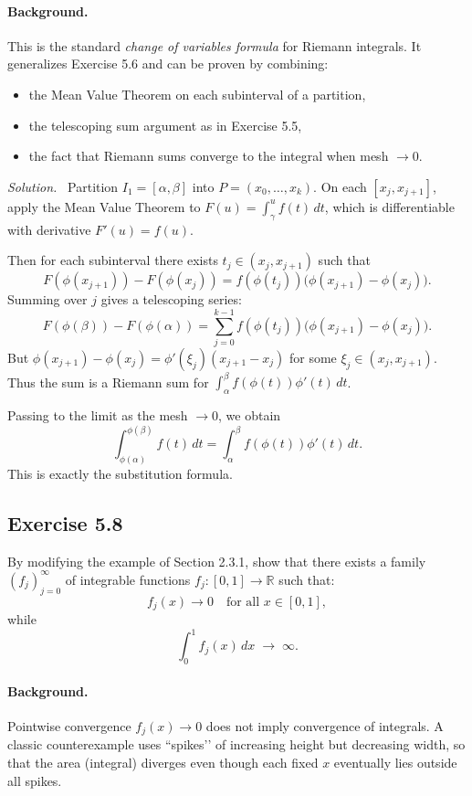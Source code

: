 \documentclass[11pt,a4paper]{article}
\newenvironment{solution}{\par\noindent\textit{Solution.}\ }{\par\vspace{0.5em}}
\begin{document}
\paragraph{Background.}
This is the standard \emph{change of variables formula} for Riemann integrals.  
It generalizes Exercise 5.6 and can be proven by combining:
\begin{itemize}
	\item the Mean Value Theorem on each subinterval of a partition,
	\item the telescoping sum argument as in Exercise 5.5,
	\item the fact that Riemann sums converge to the integral when mesh $\to 0$.
\end{itemize}

\begin{solution}
	Partition $I_1=[\alpha,\beta]$ into $P=(x_0,\ldots,x_k)$. On each $[x_j,x_{j+1}]$, apply the Mean Value Theorem to $F(u)=\int_\gamma^u f(t)\,dt$, which is differentiable with derivative $F'(u)=f(u)$.  
	
	Then for each subinterval there exists $t_j\in(x_j,x_{j+1})$ such that
	\[
	F(\phi(x_{j+1}))-F(\phi(x_j)) = f(\phi(t_j))\big(\phi(x_{j+1})-\phi(x_j)\big).
	\]
	Summing over $j$ gives a telescoping series:
	\[
	F(\phi(\beta))-F(\phi(\alpha)) = \sum_{j=0}^{k-1} f(\phi(t_j))\big(\phi(x_{j+1})-\phi(x_j)\big).
	\]
	But $\phi(x_{j+1})-\phi(x_j)=\phi'(\xi_j)(x_{j+1}-x_j)$ for some $\xi_j\in(x_j,x_{j+1})$.  
	Thus the sum is a Riemann sum for $\int_\alpha^\beta f(\phi(t))\phi'(t)\,dt$.  
	
	Passing to the limit as the mesh $\to 0$, we obtain
	\[
	\int_{\phi(\alpha)}^{\phi(\beta)} f(t)\,dt = \int_\alpha^\beta f(\phi(t))\phi'(t)\,dt.
	\]
	This is exactly the substitution formula.
\end{solution}


\subsection*{Exercise 5.8}
By modifying the example of Section 2.3.1, show that there exists a family 
$(f_j)_{j=0}^\infty$ of integrable functions $f_j:[0,1]\to\mathbb{R}$ such that:
\[
f_j(x)\to 0 \quad \text{for all } x\in[0,1],
\]
while
\[
\int_0^1 f_j(x)\,dx \;\to\;\infty.
\]

\paragraph{Background.}
Pointwise convergence $f_j(x)\to 0$ does not imply convergence of integrals.  
A classic counterexample uses ``spikes’’ of increasing height but decreasing width, so that the area (integral) diverges even though each fixed $x$ eventually lies outside all spikes.
\end{document}
